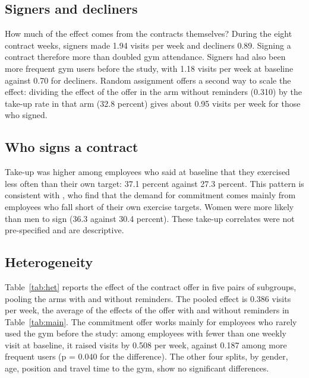 \subsection{Signers and decliners}
How much of the effect comes from the contracts themselves? During the eight contract weeks, signers made 1.94 visits per week and decliners 0.89. Signing a contract therefore more than doubled gym attendance. Signers had also been more frequent gym users before the study, with 1.18 visits per week at baseline against 0.70 for decliners. Random assignment offers a second way to scale the effect: dividing the effect of the offer in the arm without reminders (0.310) by the take-up rate in that arm (32.8 percent) gives about 0.95 visits per week for those who signed.

\subsection{Who signs a contract}
Take-up was higher among employees who said at baseline that they exercised less often than their own target: 37.1 percent against 27.3 percent. This pattern is consistent with \citet{royer2015}, who find that the demand for commitment comes mainly from employees who fall short of their own exercise targets. Women were more likely than men to sign (36.3 against 30.4 percent). These take-up correlates were not pre-specified and are descriptive.

\subsection{Heterogeneity}
Table~\ref{tab:het} reports the effect of the contract offer in five pairs of subgroups, pooling the arms with and without reminders. The pooled effect is 0.386 visits per week, the average of the effects of the offer with and without reminders in Table~\ref{tab:main}. The commitment offer works mainly for employees who rarely used the gym before the study: among employees with fewer than one weekly visit at baseline, it raised visits by 0.508 per week, against 0.187 among more frequent users (p = 0.040 for the difference). The other four splits, by gender, age, position and travel time to the gym, show no significant differences.


